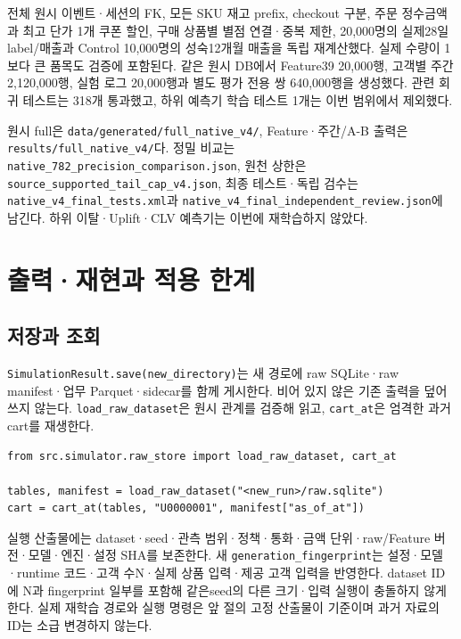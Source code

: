 \documentclass[11pt,a4paper]{article}
\newcommand{\code}[1]{{\ttfamily\footnotesize\nolinkurl{#1}}}
\newcommand{\note}[1]{\par\noindent\colorbox{pale}{\parbox{\dimexpr\linewidth-2\fboxsep}{\small #1}}\par}
\newcommand{\page}{\clearpage}
\begin{document}
전체 원시 이벤트·세션의 FK, 모든 SKU 재고 prefix, checkout 구분, 주문 정수금액과 최고 단가 1개 쿠폰 할인, 구매 상품별 별점 연결·중복 제한, 20,000명의 실제28일 label/매출과 Control 10,000명의 성숙12개월 매출을 독립 재계산했다. 실제 수량이 1보다 큰 품목도 검증에 포함된다. 같은 원시 DB에서 Feature39 20,000행, 고객별 주간 2,120,000행, 실험 로그 20,000행과 별도 평가 전용 쌍 640,000행을 생성했다. 관련 회귀 테스트는 318개 통과했고, 하위 예측기 학습 테스트 1개는 이번 범위에서 제외했다.

\note{원시 full은 \code{data/generated/full_native_v4/}, Feature·주간/A-B 출력은 \code{results/full_native_v4/}다. 정밀 비교는 \code{native_782_precision_comparison.json}, 원천 상한은 \code{source_supported_tail_cap_v4.json}, 최종 테스트·독립 검수는 \code{native_v4_final_tests.xml}과 \code{native_v4_final_independent_review.json}에 남긴다. 하위 이탈·Uplift·CLV 예측기는 이번에 재학습하지 않았다.}

\page
\section{출력·재현과 적용 한계}
\subsection{저장과 조회}
\code{SimulationResult.save(new_directory)}는 새 경로에 raw SQLite·raw manifest·업무 Parquet·sidecar를 함께 게시한다. 비어 있지 않은 기존 출력을 덮어쓰지 않는다. \code{load_raw_dataset}은 원시 관계를 검증해 읽고, \code{cart_at}은 엄격한 과거 cart를 재생한다.

{\small\begin{lstlisting}
from src.simulator.raw_store import load_raw_dataset, cart_at

tables, manifest = load_raw_dataset("<new_run>/raw.sqlite")
cart = cart_at(tables, "U0000001", manifest["as_of_at"])
\end{lstlisting}}

실행 산출물에는 dataset·seed·관측 범위·정책·통화·금액 단위·raw/Feature 버전·모델·엔진·설정 SHA를 보존한다. 새 \code{generation_fingerprint}는 설정·모델·runtime 코드·고객 수N·실제 상품 입력·제공 고객 입력을 반영한다. dataset ID에 N과 fingerprint 일부를 포함해 같은seed의 다른 크기·입력 실행이 충돌하지 않게 한다. 실제 재학습 경로와 실행 명령은 앞 절의 고정 산출물이 기준이며 과거 자료의 ID는 소급 변경하지 않는다.
\end{document}
